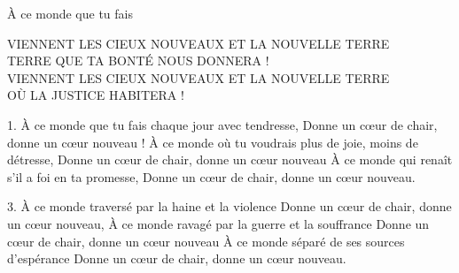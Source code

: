 À ce monde que tu fais

VIENNENT LES CIEUX NOUVEAUX ET LA NOUVELLE TERRE  \\
TERRE QUE TA BONTÉ NOUS DONNERA !\\
VIENNENT LES CIEUX NOUVEAUX ET LA NOUVELLE TERRE   \\
OÙ LA JUSTICE HABITERA !

1. À ce monde que tu fais chaque jour avec tendresse, Donne un cœur de chair, donne un cœur nouveau ! À ce monde où tu voudrais plus de joie, moins de détresse, 
Donne un cœur de chair, donne un cœur nouveau À ce monde qui renaît s’il a foi en ta promesse, Donne un cœur de chair, donne un cœur nouveau.

3. À ce monde traversé par la haine et la violence Donne un cœur de chair, donne un cœur nouveau, À ce monde ravagé par la guerre et la souffrance Donne un cœur de chair, donne un cœur nouveau À ce monde séparé de ses sources d’espérance Donne un cœur de chair, donne un cœur nouveau.

